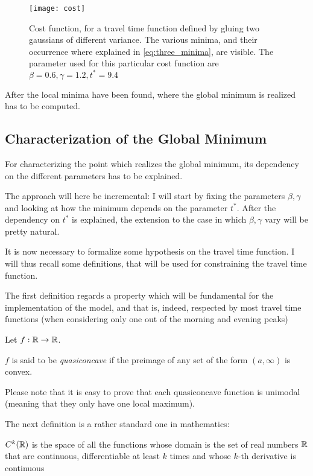 \begin{figure}
  \centering
  \texttt{[image: cost]}
  \caption{Cost function, for a travel time function defined by gluing two gaussians of different variance.
    The various minima, and their occurrence where explained in \eqref{eq:three_minima},
    are visible.
  The parameter used for this particular cost function are \(\beta = 0.6, \gamma = 1.2, t^* = 9.4\)}
  \label{fig:cost}
\end{figure}

After the local minima have been found,
where the global minimum is realized has to be computed.

\subsection{Characterization of the Global Minimum}
\label{sec:glob_min}

For characterizing the point which realizes the global minimum,
its dependency on the different parameters has to be explained.

The approach will here be incremental:
I will start by fixing the parameters \(\beta, \gamma\) and looking at how the minimum depends on the parameter \(t^*\).
After the dependency on \(t^*\) is explained, the extension to the case in which \(\beta, \gamma\) vary will be pretty natural.

It is now necessary to formalize some hypothesis on the travel time function.
I will thus recall some definitions, that will be used for constraining the travel time function.

The first definition regards a property which will be fundamental for the implementation of the model,
and that is, indeed, respected by most travel time functions (when considering only one out of the morning and evening peaks)
\begin{definition}
  Let \(f:\mathbb{R} \rightarrow \mathbb{R}\).
  
  \(f\) is said to be \textit{quasiconcave} if the preimage of any set of the form \((a, \infty)\) is convex.
\end{definition}

Please note that it is easy to prove that each quasiconcave function is unimodal (meaning that they only have one local maximum).

The next definition is a rather standard one in mathematics:
\begin{definition}
  \(C^k(\mathbb{R})\) is the space of all the functions whose domain is the set of real numbers \(\mathbb{R}\) that are continuous, differentiable at least \(k\) times and whose \(k\)-th derivative is continuous
\end{definition}

